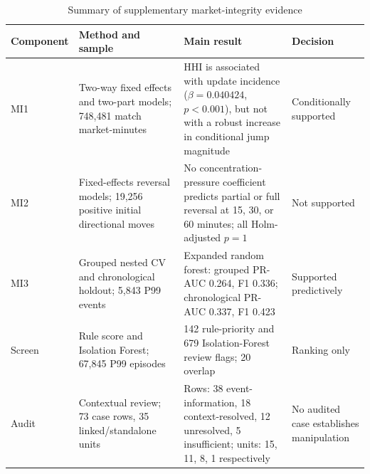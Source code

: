 \begin{table}[htbp]
\centering
\caption{Summary of supplementary market-integrity evidence}
\label{tab:rq3-integrity-results}
\small
\begin{tabular}{p{}p{}p{}p{}}
\toprule
Component & Method and sample & Main result & Decision \\
\midrule
MI1 & Two-way fixed effects and two-part models; 748,481 match market-minutes & HHI is associated with update incidence ($\beta=0.040424$, $p<0.001$), but not with a robust increase in conditional jump magnitude & Conditionally supported \\
MI2 & Fixed-effects reversal models; 19,256 positive initial directional moves & No concentration-pressure coefficient predicts partial or full reversal at 15, 30, or 60 minutes; all Holm-adjusted $p=1$ & Not supported \\
MI3 & Grouped nested CV and chronological holdout; 5,843 P99 events & Expanded random forest: grouped PR-AUC 0.264, F1 0.336; chronological PR-AUC 0.337, F1 0.423 & Supported predictively \\
Screen & Rule score and Isolation Forest; 67,845 P99 episodes & 142 rule-priority and 679 Isolation-Forest review flags; 20 overlap & Ranking only \\
Audit & Contextual review; 73 case rows, 35 linked/standalone units & Rows: 38 event-information, 18 context-resolved, 12 unresolved, 5 insufficient; units: 15, 11, 8, 1 respectively & No audited case establishes manipulation \\
\bottomrule
\end{tabular}
\end{table}
